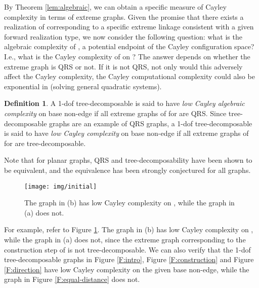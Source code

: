 \documentclass[secthm,amsthm,english]{article}
\theoremstyle{definition}
\newtheorem{definition}{Definition}
\theoremstyle{remark}
\begin{document}
By Theorem \ref{lem:algebraic}, we can obtain a specific measure of Cayley complexity in terms of extreme graphs. 
Given the promise that there exists a realization of  corresponding to 
a specific extreme linkage  consistent with a given forward realization type, 
we now consider the following question: 
what is the algebraic complexity of , a potential endpoint of the Cayley configuration space?
I.e., what is the Cayley complexity of  on ? 
The answer depends on whether the extreme graph is QRS or not. 
If it is not QRS, not only would this adversely affect the Cayley complexity, 
the Cayley computational complexity could also be exponential in   
(solving general quadratic systems). 

\begin{definition}\label{def:low}A 1-dof tree-decomposable  is said to have {\emph{low Cayley algebraic complexity}} on base non-edge  if all  extreme graphs of  for  are QRS. 
Since tree-decomposable graphs are an example of QRS graphs, 
a 1-dof tree-decomposable  is said to have {\emph{low Cayley complexity}} on base non-edge  if all  extreme graphs of  for  are tree-decomposable. 
\end{definition}

Note that for planar graphs, QRS and tree-decomposability have been shown \cite{jackson2012radically} 
to be equivalent, and the equivalence has been strongly conjectured for all graphs. 

\begin{figure}[h]
	  
	  
	
	\begin{centering}
	\texttt{[image: img/initial]}
	\par\end{centering}
	
	\caption{The graph in (b) has low Cayley complexity on , while the graph in (a) does not. }
	
	\label{F:not_low} 
\end{figure}

For example, refer to Figure \ref{F:not_low}. The graph in (b) has low Cayley complexity on , 
while the graph in (a) does not,  since the extreme graph corresponding to the construction step of 
is not tree-decomposable. 
We can also verify that the 1-dof tree-decomposable graphs in Figure \ref{F:intro}, Figure \ref{F:construction} and Figure \ref{F:direction}  have low Cayley complexity on the given base non-edge, 
while the graph in Figure \ref{F:equal-distance} does not.
\end{document}
